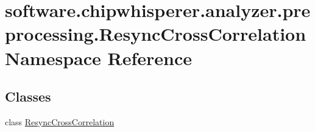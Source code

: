 \hypertarget{namespacesoftware_1_1chipwhisperer_1_1analyzer_1_1preprocessing_1_1ResyncCrossCorrelation}{}\section{software.\+chipwhisperer.\+analyzer.\+preprocessing.\+Resync\+Cross\+Correlation Namespace Reference}
\label{namespacesoftware_1_1chipwhisperer_1_1analyzer_1_1preprocessing_1_1ResyncCrossCorrelation}
\subsection*{Classes}
\begin{DoxyCompactItemize}
\item 
class \hyperlink{classsoftware_1_1chipwhisperer_1_1analyzer_1_1preprocessing_1_1ResyncCrossCorrelation_1_1ResyncCrossCorrelation}{Resync\+Cross\+Correlation}
\end{DoxyCompactItemize}
